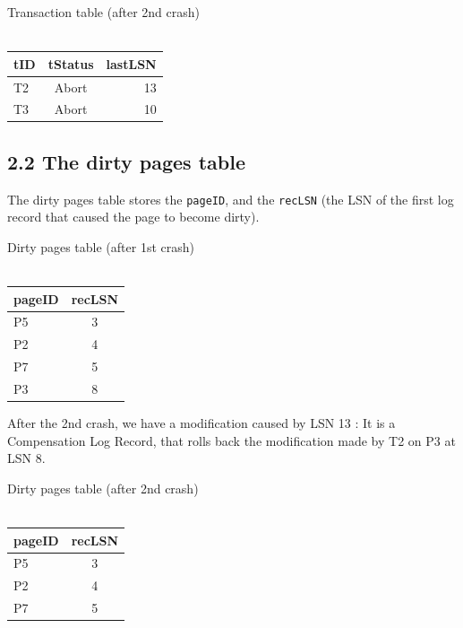 \documentclass[paper=a4, fontsize=11pt]{scrartcl} %
\numberwithin{equation}{section} %
\numberwithin{figure}{section} %
\numberwithin{table}{section} %
\begin{document}
\begin{center}
  Transaction table (after 2nd crash)\\~\\
  \begin{tabular}{ l | c | r }
    \hline
    \textbf{tID} & \textbf{tStatus} & \textbf{lastLSN} \\ \hline
    T2 & Abort & 13 \\ \hline
    T3 & Abort & 10 \\
    \hline
  \end{tabular}
\end{center}

\subsection{2.2 The dirty pages table}
The dirty pages table stores the \verb|pageID|, and the \verb|recLSN| (the LSN of the first log record that caused the page to become dirty).\\

\begin{center}
  Dirty pages table (after 1st crash)\\~\\
  \begin{tabular}{ l | c }
    \hline
    \textbf{pageID} & \textbf{recLSN} \\ \hline
    P5 & 3 \\ \hline
    P2 & 4 \\  \hline
    P7 & 5 \\  \hline
    P3 & 8 \\  \hline
  \end{tabular}
\end{center}

After the 2nd crash, we have a modification caused by LSN 13 : It is a Compensation Log Record, that rolls back the modification made by T2 on P3 at LSN 8.\\
\begin{center}
  Dirty pages table (after 2nd crash)\\~\\
  \begin{tabular}{ l | c }
    \hline
    \textbf{pageID} & \textbf{recLSN} \\ \hline
    P5 & 3 \\ \hline
    P2 & 4 \\  \hline
    P7 & 5 \\  \hline
  \end{tabular}
\end{center}
\end{document}
